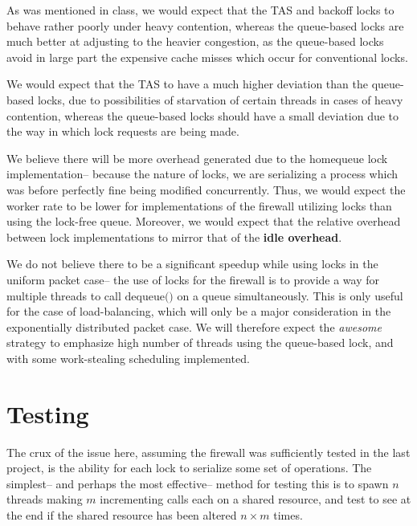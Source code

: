 \documentclass{article}
\newcommand{\ti}[1]{\emph{#1}}
\newcommand{\tb}[1]{\textbf{#1}}
\newcommand{\cpart}[1]{\newblock{\LARGE {\\\\#1}}}
\newcommand{\code}[1]{\texttt{$\text{#1}$}}
\begin{document}
\cpart{Lock Scaling}

As was mentioned in class, we would expect that the TAS and backoff locks to behave rather poorly under heavy contention, whereas the queue-based locks are much 
better at adjusting to the heavier congestion, as the queue-based locks avoid in large part the expensive cache misses which occur for conventional locks.

\cpart{Fairness}

We would expect that the TAS to have a much higher deviation than the queue-based locks, due to possibilities of starvation of certain threads in cases of heavy 
contention, whereas the queue-based locks should have a small deviation due to the way in which lock requests are being made.

\cpart{Packet Overhead}

We believe there will be more overhead generated due to the homequeue lock implementation-- because the nature of locks, we are serializing a process which was 
before perfectly fine being modified concurrently. Thus, we would expect the worker rate to be lower for implementations of the firewall utilizing locks than using 
the lock-free queue. Moreover, we would expect that the relative overhead between lock implementations to mirror that of the \tb{idle overhead}.

\cpart{Packet Scaling}

We do not believe there to be a significant speedup while using locks in the uniform packet case-- the use of locks for the firewall is to provide a way for 
multiple threads to call \code{dequeue()} on a queue simultaneously. This is only useful for the case of load-balancing, which will only be a major consideration in 
the exponentially distributed packet case. We will therefore expect the \ti{awesome} strategy to emphasize high number of threads using the queue-based lock, and 
with some work-stealing scheduling implemented.

\section{Testing}

The crux of the issue here, assuming the firewall was sufficiently tested in the last project, is the ability for each lock to serialize some set of operations. The 
simplest-- and perhaps the most effective-- method for testing this is to spawn $n$ threads making $m$ incrementing calls each on a shared resource, and test to see 
at the end if the shared resource has been altered $n\times m$ times.
\end{document}
